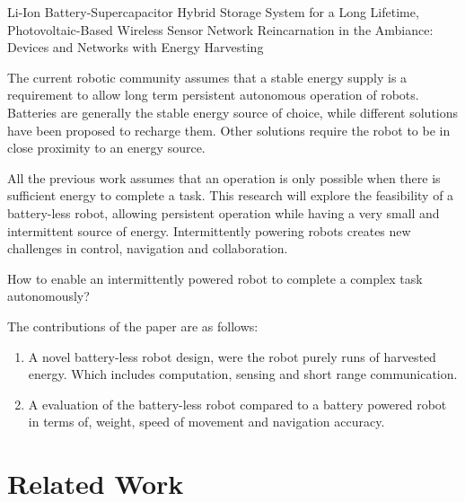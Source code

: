 \documentclass[letterpaper, 10 pt, conference]{ieeeconf}  %
\begin{document}
Li-Ion Battery-Supercapacitor Hybrid Storage System for a Long Lifetime, Photovoltaic-Based Wireless Sensor Network	\cite{ongaro_pwre_2012}
Reincarnation in the Ambiance: Devices and Networks with Energy Harvesting \cite{prasad_comst_2014}


The current robotic community assumes that a stable energy supply is a requirement to allow long term persistent autonomous operation of robots.
Batteries are generally the stable energy source of choice, while different solutions have been proposed to recharge them.
Other solutions require the robot to be in close proximity to an energy source.


% 
All the previous work assumes that an operation is only possible when there is sufficient energy to complete a task.
This research will explore the feasibility of a battery-less robot, allowing persistent operation while having a very small and intermittent source of energy.
Intermittently powering robots creates new challenges in control, navigation and collaboration.


How to enable an intermittently powered robot to complete a complex task autonomously?


The contributions of the paper are as follows:

\begin{enumerate}
\item A novel battery-less robot design, were the robot purely runs of harvested energy. Which includes computation, sensing and short range communication.

\item A evaluation of the battery-less robot compared to a battery powered robot in terms of, weight, speed of movement and navigation accuracy.
\end{enumerate}
 

\section{Related Work}
\end{document}
